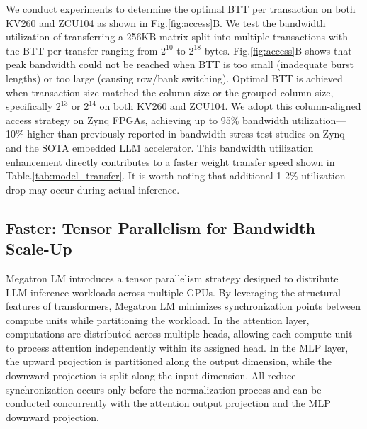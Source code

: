 \documentclass[conference]{IEEEtran}
\begin{document}
We conduct experiments to determine the optimal BTT per transaction on both KV260 and ZCU104 as shown in Fig.\ref{fig:access}B.
We test the bandwidth utilization of transferring a 256KB matrix split into multiple transactions with the BTT per transfer ranging from $2^{10}$ to $2^{18}$ bytes. Fig.\ref{fig:access}B shows that peak bandwidth could not be reached when BTT is too small (inadequate burst lengths) or too large (causing row/bank switching). Optimal BTT is achieved when transaction size matched the column size or the grouped column size, specifically $2^{13}$ or $2^{14}$ on both KV260 and ZCU104.
We adopt this column-aligned access strategy on Zynq FPGAs, achieving up to 95\% bandwidth utilization—10\% higher than previously reported in bandwidth stress-test studies on Zynq\cite{manev2019unexpected, brilli2022understanding} and the SOTA embedded LLM accelerator\cite{li2025pushing}.
This bandwidth utilization enhancement directly contributes to a faster weight transfer speed shown in Table.\ref{tab:model_transfer}.
It is worth noting that additional 1-2\% utilization drop may occur during actual inference.


\subsection{Faster: Tensor Parallelism for Bandwidth Scale-Up}

Megatron LM\cite{shoeybi2019megatron} introduces a tensor parallelism strategy designed to distribute LLM inference workloads across multiple GPUs. By leveraging the structural features of transformers\cite{vaswani2017attention}, Megatron LM minimizes synchronization points between compute units while partitioning the workload.
In the attention layer, computations are distributed across multiple heads, allowing each compute unit to process attention independently within its assigned head. In the MLP layer, the upward projection is partitioned along the output dimension, while the downward projection is split along the input dimension. All-reduce synchronization occurs only before the normalization process and can be conducted concurrently with the attention output projection and the MLP downward projection.
\end{document}

